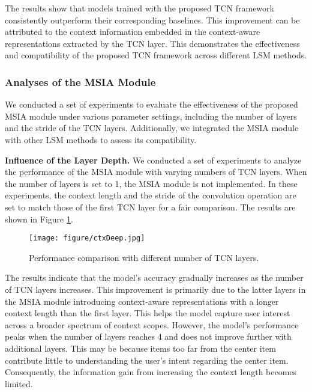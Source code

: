 The results show that models trained with the proposed TCN framework consistently outperform their corresponding baselines. This improvement can be attributed to the context information embedded in the context-aware representations extracted by the TCN layer. This demonstrates the effectiveness and compatibility of the proposed TCN framework across different LSM methods. 

\subsubsection{\textbf{Analyses of the MSIA Module}}

We conducted a set of experiments to evaluate the effectiveness of the proposed MSIA module under various parameter settings, including the number of layers and the stride of the TCN layers. Additionally, we integrated the MSIA module with other LSM methods to assess its compatibility. 

\textbf{Influence of the Layer Depth.} We conducted a set of experiments to analyze the performance of the MSIA module with varying numbers of TCN layers. When the number of layers is set to 1, the MSIA module is not implemented. In these experiments, the context length and the stride of the convolution operation are set to match those of the first TCN layer for a fair comparison. The results are shown in Figure \ref{fig:MSIALayerDepth}.

\begin{figure}
    \centering
    \texttt{[image: figure/ctxDeep.jpg]}
    \caption{Performance comparison with different number of TCN layers. }
    \label{fig:MSIALayerDepth}
    \vspace{-0.5cm}
\end{figure}

The results indicate that the model's accuracy gradually increases as the number of TCN layers increases. This improvement is primarily due to the latter layers in the MSIA module introducing context-aware representations with a longer context length than the first layer. This helps the model capture user interest across a broader spectrum of context scopes. However, the model's performance peaks when the number of layers reaches 4 and does not improve further with additional layers. This may be because items too far from the center item contribute little to understanding the user's intent regarding the center item. Consequently, the information gain from increasing the context length becomes limited. 

